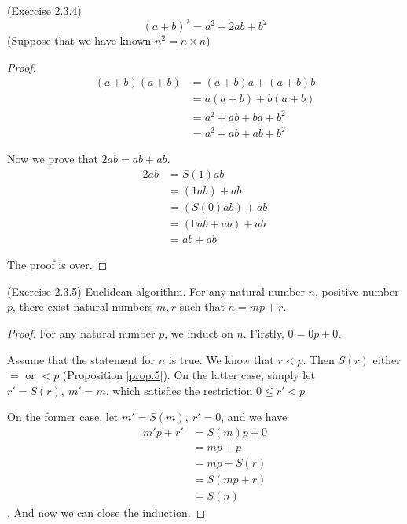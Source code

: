 \begin{prop}
(Exercise 2.3.4) \label{exercise2.3.4}
\[
(a+b)^2=a^2+2ab+b^2
\]
(Suppose that we have known $n^2=n \times n$)
\end{prop}
\begin{proof}
\begin{align*}
(a+b)(a+b) 
&= (a+b)a+(a+b)b \tag{Distribution law} \\
&= a(a+b) + b(a+b) \tag{Commutativity} \\
&= a^2+ab+ba+b^2 \tag{Distribution law} \\
&= a^2+ab+ab+b^2 \tag{Commutativity}
\end{align*}

Now we prove that $2ab = ab+ab$.
\begin{align*}
2ab
&=S(1)ab \\
&=(1ab)+ab\\
&=(S(0)ab)+ab\\
&=(0ab+ab)+ab\\
&=ab+ab
\end{align*}

The proof is over. \qedhere
\end{proof}

\begin{prop}
(Exercise 2.3.5) \label{exercise2.3.5}
Euclidean algorithm. For any natural number $n$, positive number $p$, there exist natural numbers $m,r$ 
such that $n=mp+r$.
\end{prop}
\begin{proof}
For any natural number $p$, we induct on $n$. Firstly, $0=0p+0$. 

Assume that the statement for $n$ is true. We know that $r<p$. Then $S(r)$ either $=$ or $<p$ 
(Proposition \ref{prop.5}). On the latter case, simply let $r'=S(r),\ m'=m$, which satisfies the 
restriction $0\leq r' <p$ 

On the former case, let $m'=S(m),\ r'=0$, and we have
\begin{align*}
m'p+r'
&= S(m)p+0\\
&= mp + p\\
&= mp + S(r) \tag{$p=S(r)$}\\
&= S(mp+r)\\
&= S(n)
\end{align*}.
And now we can close the induction.
\end{proof}